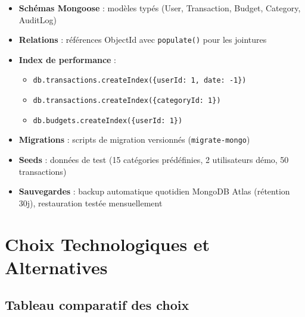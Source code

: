 \begin{itemize}
  \item \textbf{Schémas Mongoose} : modèles typés (User, Transaction, Budget, Category, AuditLog)
  \item \textbf{Relations} : références ObjectId avec \texttt{populate()} pour les jointures
  \item \textbf{Index de performance} :
    \begin{itemize}
      \item \texttt{db.transactions.createIndex(\{userId: 1, date: -1\})}
      \item \texttt{db.transactions.createIndex(\{categoryId: 1\})}
      \item \texttt{db.budgets.createIndex(\{userId: 1\})}
    \end{itemize}
  \item \textbf{Migrations} : scripts de migration versionnés (\texttt{migrate-mongo})
  \item \textbf{Seeds} : données de test (15 catégories prédéfinies, 2 utilisateurs démo, 50 transactions)
  \item \textbf{Sauvegardes} : backup automatique quotidien MongoDB Atlas (rétention 30j), restauration testée mensuellement
\end{itemize}

\section{Choix Technologiques et Alternatives}

\subsection{Tableau comparatif des choix}

